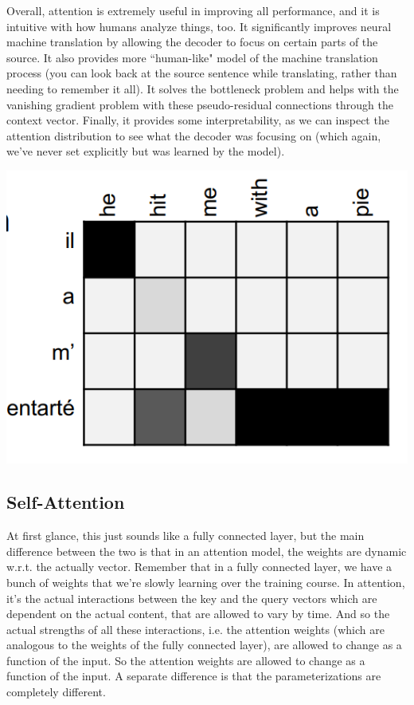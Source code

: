\documentclass{article}
\theoremstyle{definition}
\theoremstyle{remark}
\theoremstyle{definition}
\begin{document}
Overall, attention is extremely useful in improving all performance, and it is intuitive with how humans analyze things, too. It significantly improves neural machine translation by allowing the decoder to focus on certain parts of the source. It also provides more ``human-like" model of the machine translation process (you can look back at the source sentence while translating, rather than needing to remember it all). It solves the bottleneck problem and helps with the vanishing gradient problem with these pseudo-residual connections through the context vector. Finally, it provides some interpretability, as we can inspect the attention distribution to see what the decoder was focusing on (which again, we've never set explicitly but was learned by the model). 
\begin{center}
    \includegraphics[scale=0.3]{Images/attention_distribution.png}
\end{center}


\subsection{Self-Attention}

At first glance, this just sounds like a fully connected layer, but the main difference between the two is that in an attention model, the weights are dynamic w.r.t. the actually vector. Remember that in a fully connected layer, we have a bunch of weights that we're slowly learning over the training course. In attention, it's the actual interactions between the key and the query vectors which are dependent on the actual content, that are allowed to vary by time. And so the actual strengths of all these interactions, i.e. the attention weights (which are analogous to the weights of the fully connected layer), are allowed to change as a function of the input. So the attention weights are allowed to change as a function of the input. A separate difference is that the parameterizations are completely different. 
\end{document}
